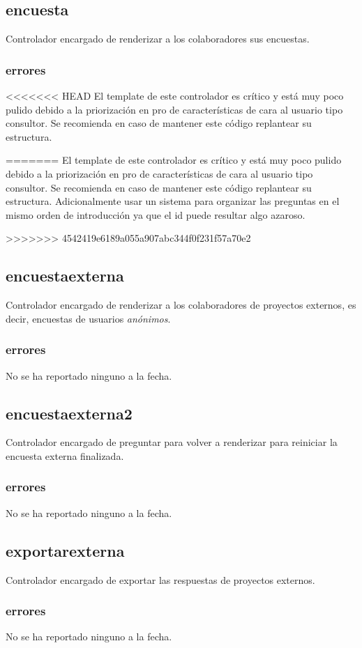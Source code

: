 \documentclass[10pt,a4paper]{book}
\begin{document}
	\subsection{encuesta}
	Controlador encargado de renderizar a los colaboradores sus encuestas.
	\subsubsection{errores}
<<<<<<< HEAD
	El template de este controlador es crítico y está muy poco pulido debido a la priorización en pro de características de cara al usuario tipo consultor. Se recomienda en caso de mantener este código replantear su estructura.

=======
	El template de este controlador es crítico y está muy poco pulido debido a la priorización en pro de características de cara al usuario tipo consultor. Se recomienda en caso de mantener este código replantear su estructura. Adicionalmente usar un sistema para organizar las preguntas en el mismo orden de introducción ya que el id puede resultar algo azaroso.
	
>>>>>>> 4542419e6189a055a907abc344f0f231f57a70e2
	\subsection{encuestaexterna}
	Controlador encargado de renderizar a los colaboradores de proyectos externos, es decir, encuestas de usuarios \textit{anónimos}.
	\subsubsection{errores}
	No se ha reportado ninguno a la fecha.

	\subsection{encuestaexterna2}
	Controlador encargado de preguntar para volver a renderizar para reiniciar la encuesta externa finalizada.
	\subsubsection{errores}
	No se ha reportado ninguno a la fecha.

	\subsection{exportarexterna}
	Controlador encargado de exportar las respuestas de proyectos externos.
	\subsubsection{errores}
	No se ha reportado ninguno a la fecha.
\end{document}
